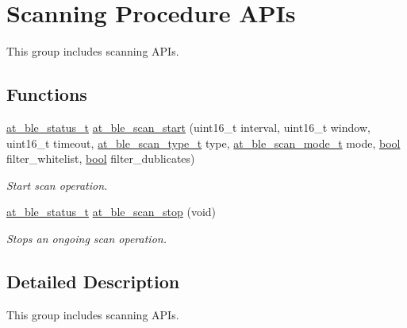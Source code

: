 \hypertarget{group__gap__scan__group}{}\section{Scanning Procedure A\+P\+Is}
\label{group__gap__scan__group}


This group includes scanning A\+P\+Is.  


\subsection*{Functions}
\begin{DoxyCompactItemize}
\item 
\mbox{\hyperlink{group__error__codes__group_ga3b1db9b95feb157b3c188ca27fe76988}{at\+\_\+ble\+\_\+status\+\_\+t}} \mbox{\hyperlink{group__gap__scan__group_ga26972125714f8cee1bc5a59d5b82623f}{at\+\_\+ble\+\_\+scan\+\_\+start}} (uint16\+\_\+t interval, uint16\+\_\+t window, uint16\+\_\+t timeout, \mbox{\hyperlink{at__ble__api_8h_aaf0f86429cbfecd3e7aff55ca39c9121}{at\+\_\+ble\+\_\+scan\+\_\+type\+\_\+t}} type, \mbox{\hyperlink{at__ble__api_8h_adfc2135fa2348d39943a1cf12b0e7d49}{at\+\_\+ble\+\_\+scan\+\_\+mode\+\_\+t}} mode, \mbox{\hyperlink{group__group__sam0__utils_ga97a80ca1602ebf2303258971a2c938e2}{bool}} filter\+\_\+whitelist, \mbox{\hyperlink{group__group__sam0__utils_ga97a80ca1602ebf2303258971a2c938e2}{bool}} filter\+\_\+dublicates)
\begin{DoxyCompactList}\small\item\em Start scan operation. \end{DoxyCompactList}\item 
\mbox{\hyperlink{group__error__codes__group_ga3b1db9b95feb157b3c188ca27fe76988}{at\+\_\+ble\+\_\+status\+\_\+t}} \mbox{\hyperlink{group__gap__scan__group_gae7efc689bfa835b6870bd304726cb56f}{at\+\_\+ble\+\_\+scan\+\_\+stop}} (void)
\begin{DoxyCompactList}\small\item\em Stops an ongoing scan operation. \end{DoxyCompactList}\end{DoxyCompactItemize}


\subsection{Detailed Description}
This group includes scanning A\+P\+Is. 



